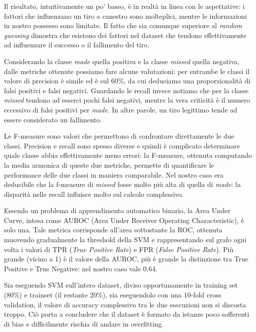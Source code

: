Il risultato, intuitivamente un po' basso, è in realtà in linea con le aspettative: i fattori che influenzano un tiro a canestro sono molteplici, mentre le informazioni in nostro possesso sono limitate. Il fatto che sia comunque  superiore al \textit{random guessing} dimostra che esistono dei fattori nel dataset che tendono effettivamente ad influenzare il successo o il fallimento del tiro.

\par
Considerando la classe \textit{made} quella positiva e la classe \textit{missed} quella negativa, dalle metriche ottenute possiamo fare alcune valutazioni: per entrambe le classi il valore di precision è simile ed è sul 60\%, da cui deduciamo una proporzionalità di falsi positivi e falsi negativi.
Guardando le recall invece notiamo che per la classe \textit{missed} tendono ad esserci pochi falsi negativi, mentre la vera criticità è il numero eccessivo di falsi positivi per \textit{made}. In altre parole, un tiro legittimo tende ad essere considerato un fallimento.

Le F-measure sono valori che permettono di confrontare direttamente le due classi. Precision e recall sono spesso diverse e quindi è complicato determinare quale classe abbia effettivamente meno errori: la F-measure, ottenuta computando la media armonica di queste due metriche, permette di quantificare le performance delle due classi in maniera comparabile. Nel nostro caso era deducibile che la f-measure di \textit{missed} fosse molto più alta di quella di \textit{made}: la disparità nelle recall influisce molto sul calcolo complessivo.

Essendo un problema di apprendimento automatico binario, la Area Under Curve, intesa come AUROC (Area Under Receiver Operating Characteristic), è solo una. Tale metrica corrisponde all'area sottostante la ROC, ottenuta muovendo gradualmente la threshold della SVM e rappresentando sul grafo ogni volta i valori di TPR (\textit{True Positive Rate}) e FPR (\textit{False Positive Rate}).
Più grande (vicino a 1) è il valore della AUROC, più è grande la distinzione tra True Positive e True Negative: nel nostro caso vale 0.64.

\par
Sia eseguendo SVM sull'intero dataset, diviso opportunamente in training set (80\%) e trainset (il restante 20\%), sia eseguendolo con una 10-fold cross validation, il valore di accuracy complessivo tra le due esecuzioni non si discosta troppo. Ciò porta a concludere che il dataset è formato da istanze poco sofferenti di bias e difficilmente rischia di andare in overfitting.

